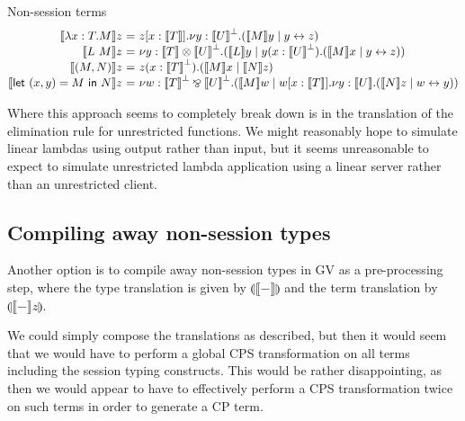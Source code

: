 \documentclass{easychair}
\makeatletter
\newcommand{\ba}{\begin{array}}
\newcommand{\ea}{\end{array}}
\newenvironment{equations}{\[\ba{@{}r@{~}c@{~}l@{}}}{\ea\]}
\newcommand{\key}{\mathsf}
\newcommand{\gvtocp}[1]{\llbracket{#1}\rrbracket}
\newcommand{\cptogv}[1]{\llparenthesis{#1}\rrparenthesis}
\newcommand{\gvPair}[2]{({#1},{#2})}
\newcommand{\gvLet}[3]{\key{let}~{#1}={#2}~\key{in}~{#3}}
\newcommand{\cpLink}[2]{{#1} \leftrightarrow {#2}}
\newcommand{\cpCut}[3]{\nu {#1}.({#2} \mid {#3})}
\newcommand{\cpInput}[3]{{#1}({#2}).{#3}}
\newcommand{\cpTimes}[2]{{#1} \otimes {#2}}
\newcommand{\cpPar}[2]{{#1} \mathbin{\bindnasrepma} {#2}}
\newcommand{\cpDual}[1]{{#1}^\bot}
\newcommand{\gvtocpd}[1]{\gvtocp{#1}}
\newcommand{\cpMix}[2]{({#1} \mid {#2})}
\newcommand{\cpCutOutput}[5]{{#2}[{#3}].\nu{#1}.\cpMix{#4}{#5}}
\makeatother
\begin{document}



Non-session terms
\begin{equations}
\gvtocpd{\lambda x:T.M}z &=&
  \cpCutOutput{y:{\cpDual{\gvtocpd{U}}}}{z}{x:{\gvtocpd{T}}}
              {\gvtocpd{M}y}{\cpLink{y}{z}} \\
\gvtocpd{L~M}z &=&
  \cpCut{y:\cpTimes{\gvtocpd{T}}{\cpDual{\gvtocpd{U}}}}
        {\gvtocpd{L}y}
        {\cpInput{y}{x:\cpDual{\gvtocpd{U}}}{\cpMix{\gvtocpd{M}x}{\cpLink{y}{z}}}} \\
\gvtocpd{\gvPair{M}{N}}z &=&
  \cpInput{z}{x:\cpDual{\gvtocpd{T}}}{\cpMix{\gvtocpd{M}x}{\gvtocpd{N}z}} \\
\gvtocpd{\gvLet{\gvPair{x}{y}}{M}{N}}z &=&
  \cpCut{w:\cpPar{\cpDual{\gvtocpd{T}}}{\cpDual{\gvtocpd{U}}}}
    {\gvtocpd{M}w}
    {\cpCutOutput{y:\gvtocpd{U}}{w}{x:\gvtocpd{T}}{\gvtocpd{N}z}{\cpLink{w}{y}}} \\
\end{equations}

Where this approach seems to completely break down is in the
translation of the elimination rule for unrestricted functions. We
might reasonably hope to simulate linear lambdas using output rather
than input, but it seems unreasonable to expect to simulate
unrestricted lambda application using a linear server rather than an
unrestricted client.

\subsection{Compiling away non-session types}

Another option is to compile away non-session types in GV as a
pre-processing step, where the type translation is given by
$\cptogv{\gvtocp{-}}$ and the term translation by
$\cptogv{\gvtocp{-}z}$.



We could simply compose the translations as described, but then it
would seem that we would have to perform a global CPS transformation
on all terms including the session typing constructs. This would be
rather disappointing, as then we would appear to have to effectively
perform a CPS transformation twice on such terms in order to generate
a CP term.
\end{document}
